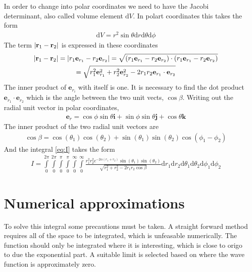 \documentclass[11pt,a4paper,english,final]{article}
\numberwithin{equation}{section}
\newcommand{\ve}[1]{\mathbf{#1}} %
\newcommand{\di}{\mathrm{d}}
\begin{document}
In order to change into polar coordinates we need to have the Jacobi 
determinant, also called volume 
element $\di V$. In polart coordinates this takes the form
\begin{gather}
\di V = r^2\sin\theta \di r\di\theta\di\phi
\end{gather}
The term $\abs{\ve{r}_1 - \ve{r}_2}$ is expressed in these coordinates
\begin{gather}
\abs{\ve{r}_1 - \ve{r}_2} = \abs{r_1 \ve{e}_{r_1} - r_2\ve{e}_{r_2}}
 = \sqrt{(r_1 \ve{e}_{r_1} -  r_2\ve{e}_{r_2})\cdot 
 (r_1 \ve{e}_{r_1} - r_2\ve{e}_{r_2})}\\
 = \sqrt{r_1^2\ve{e}_{r_1}^2 + r_2^2\ve{e}_{r_2}^2  
 - 2r_1r_2 \ve{e}_{r_1}\cdot \ve{e}_{r_2}}
\end{gather}
The inner product of $\ve{e}_{r_i}$ with itself is one. It is necessary 
to find the dot product $\ve{e}_{r_1}\cdot \ve{e}_{r_2}$ which is the 
angle between the two unit vects, $\cos\beta$.
Writing out the radial unit vector in 
polar coordinates,
\begin{gather}
\ve{e}_r = \cos\phi\sin\theta \ve{i} + \sin\phi\sin\theta\ve{j} 
+ \cos\theta\ve{k}
\end{gather}
The inner product of the two radial unit vectors are 
\begin{gather}
\cos\beta = \cos(\theta_1)\cos(\theta_2)
+ \sin(\theta_1)\sin(\theta_2)\cos(\phi_1 - \phi_2)
\label{eq:cosbeta}
\end{gather}
And the integral \eqref{eq:I} takes the form
\begin{gather} I = 
\int\limits_0^{2\pi}\!\int\limits_0^{2\pi}\!
\int\limits_0^\pi\!\int\limits_0^\pi\!
\int\limits_0^\infty\!\int\limits_0^\infty 
\frac{r_1^2r_2^2 e^{-2\alpha(r_1 + r_2)} \sin(\theta_1)\sin(\theta_2)
}{\sqrt{ r_1^2 + r_2^2 - 2r_1r_2\cos\beta }}
\di r_1\di r_2\di\theta_1 \di\theta_2 \di\phi_1 \di\phi_2
\label{eq:IR}
\end{gather}

\section{Numerical approximations}

To solve this integral some precautions must be taken.
A straight forward method requires all of the space to be integrated,
which is unfeasable numerically. 
The function should only be integrated where it is interesting, which 
is close to origo to due the exponential part. A suitable limit 
is selected based on where the wave function is approximately zero.
\end{document}
